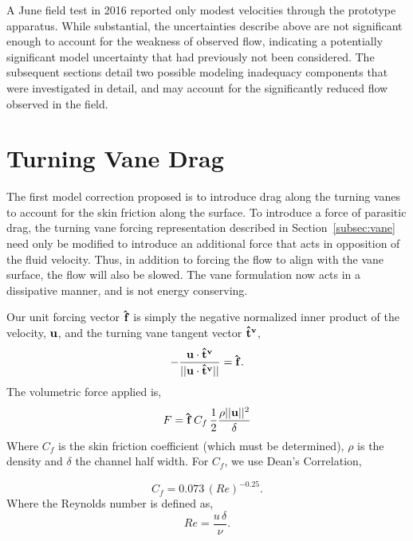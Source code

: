 
A June field test in 2016 reported only modest velocities through the
prototype apparatus.
While substantial, the uncertainties describe above are not significant
enough to account for the weakness of observed flow, indicating a
potentially significant model uncertainty that had previously not been
considered. The subsequent sections detail two possible modeling
inadequacy components that were investigated in detail, and may account
for the significantly reduced flow observed in the field. 

\section{Turning Vane Drag}

The first model correction proposed is to introduce drag along the
turning vanes to account for the skin friction along the surface. To
introduce a force of parasitic drag, the turning vane forcing 
representation described in Section~\ref{subsec:vane} need only be
modified to introduce an additional force that acts in opposition of the
fluid velocity. Thus, in addition to forcing the flow to align with the
vane surface, the flow will also be slowed. The vane formulation now
acts in a dissipative manner, and is not energy conserving. 

Our unit forcing vector ${\bf \hat f}$ is simply the negative normalized inner
product of the velocity, ${\bf u}$, and the turning vane tangent vector
${\bf \hat t^v}$,  
\begin{equation}
- \frac{{\bf u} \cdot {\bf \hat t^v}}{|| {\bf u} \cdot {\bf \hat t^v}
 ||} = {\bf \hat f}.  
\end{equation}
The volumetric force applied is, 
\begin{equation}
 F = {\bf \hat f} \, C_f \, \frac{1}{2} \frac{\rho || {\bf u} ||^2}{\delta}
\end{equation}
Where $C_f$ is the skin friction coefficient (which must be determined),
$\rho $ is the density and $\delta$ the channel half width. 
For $C_f$, we use Dean's Correlation\cite{johnson1998handbook}, 

%
%
\begin{equation}
 C_f = 0.073 \, (Re)^{-0.25}. 
\end{equation}
Where the Reynolds number is defined as, 
\begin{equation}
 Re = \frac{u\, \delta}{\nu}.
\end{equation}

